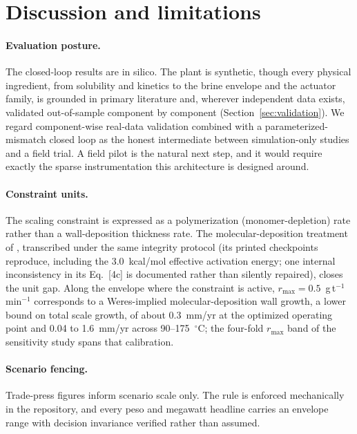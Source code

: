 \section{Discussion and limitations}\label{sec:discussion}

\paragraph{Evaluation posture.} The closed-loop results are in silico.
The plant is synthetic, though every physical ingredient, from
solubility and kinetics to the brine envelope and the actuator family,
is grounded in primary literature and, wherever independent data
exists, validated out-of-sample component by component
(Section~\ref{sec:validation}). We regard component-wise real-data
validation combined with a parameterized-mismatch closed loop as the
honest intermediate between simulation-only studies and a field trial.
A field pilot is the natural next step, and it would require exactly
the sparse instrumentation this architecture is designed around.

\paragraph{Constraint units.} The scaling constraint is expressed as a
polymerization (monomer-depletion) rate rather than a wall-deposition
thickness rate. The molecular-deposition treatment of
\citet{weres1981kinetics}, transcribed under the same integrity
protocol (its printed checkpoints reproduce, including the 3.0~kcal/mol
effective activation energy; one internal inconsistency in its
Eq.~[4c] is documented rather than silently repaired), closes the unit
gap. Along the envelope where the constraint is active,
$r_{\max} = 0.5$~g\,t$^{-1}$\,min$^{-1}$ corresponds to a Weres-implied
molecular-deposition wall growth, a lower bound on total scale growth,
of about 0.3~mm/yr at the optimized operating point and 0.04 to
1.6~mm/yr across 90--175~$^{\circ}$C; the four-fold $r_{\max}$ band of
the sensitivity study spans that calibration.

\paragraph{Scenario fencing.} Trade-press figures inform scenario scale
only. The rule is enforced mechanically in the repository, and every
peso and megawatt headline carries an envelope range with decision
invariance verified rather than assumed.

